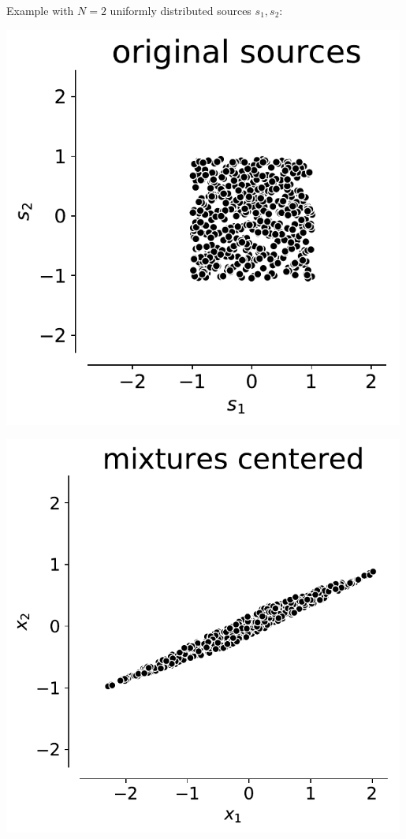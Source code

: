 \begin{frame}{\subsubsecname}

Example with $N=2$ uniformly distributed sources $s_1, s_2$:

 \begin{center}
  \begin{minipage}{0.29\textwidth}
\includegraphics[width=0.99\textwidth]{./img/uniform_original_sources} 
  \end{minipage}
  \hspace{5mm}
  \begin{minipage}{0.29\textwidth}
\includegraphics[width=0.99\textwidth]{./img/uniform_mixtures_centered} 
  \end{minipage}\\
  

\end{center}
\end{frame}
